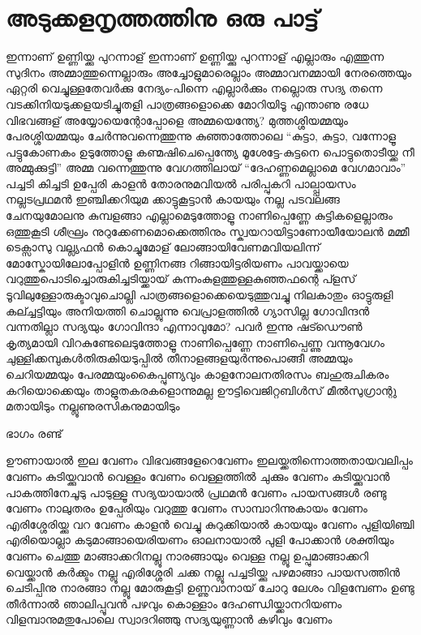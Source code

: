 \section{അടുക്കളനൃത്തത്തിനു ഒരു പാട്ട്}
\obeylines
\noindent
ഇന്നാണ്‌ ഉണ്ണിയ്ക്കു പുറന്നാള്‌
ഇന്നാണ്‌ ഉണ്ണിയ്ക്കു പുറന്നാള്‌
എല്ലാരും എത്തുന്ന സുദിനം
അമ്മാത്തുന്നെല്ലാരും അച്ചോളുമാരെല്ലാം
അമ്മാവനമ്മായി നേരത്തെയും
ഏറ്റരി വെച്ചുള്ളതേവർക്കു നേദ്യം-പിന്നെ
എല്ലാർക്കും നല്ലൊരു സദ്യ തന്നെ
വടക്കിനിയടുക്കളയടിച്ചുതളി
പാത്രങ്ങളൊക്കെ മോറിയിടൂ
എന്താണു രധേ വിഭവങ്ങള്‌
അയ്യോയെന്റോപ്പോളെ അമ്മയെന്ത്യേ?
മുത്തശ്ശിയമ്മയും പേരശ്ശിയമ്മയും
 ചേർന്നുവന്നെത്തുന്നു കുഞ്ഞാത്തോലെ
“കുട്ടാ, കുട്ടാ, വന്നോളൂ പട്ടുകോണകം ഉടുത്തോളൂ
കണ്മഷിചെപ്പെന്ത്യേ മൂശേട്ടേ-കുട്ടനെ
പൊട്ടുതൊടീയ്ക്ക നീ അമ്മുക്കുട്ടി”
അമ്മ വന്നെത്തുന്നു വേഗത്തിലായ്
“ദേഹണ്ണമെല്ലാമെ വേഗമാവാം”
പച്ചടി കിച്ചടി ഉപ്പേരി കാളൻ
തോരനുമവിയൽ പരിപ്പുകറി
പാല്പ്പായസം നല്ലടപ്രഥമൻ
ഇഞ്ചിക്കറിയുമ ക്കാട്ടുകൂട്ടാൻ
കായയും നല്ല പടവലങ്ങ
ചേനയുമോലനു കുമ്പളങ്ങാ
എല്ലാമെടുത്തോളൂ നാണിപ്പെണ്ണേ
കുട്ടികളെല്ലാരും ഒത്തുകൂടി
ശീഘ്രം നുറുക്കേണമൊക്കെത്തിനും
സ്ക്വയറായിട്ടാണോയീയോലൻ മമ്മീ
ടെക്സാസു വല്ല്യഫൻ കൊച്ചുമോള്‌
ലോങ്ങായിവേണമവിയലിന്ന്
മോസ്കോയിലോപ്പോളിൻ ഉണ്ണിനങ്ങ
റിങ്ങായിട്ടരിയണം പാവയ്ക്കായെ
വറുത്തുപൊടിച്ചൊരുകിച്ചടിയ്ക്കായ്
കുന്നംകുളത്തുള്ളകുഞ്ഞഫന്റെ
പ്ളസ് ടൂവിലുള്ളോരുക്ടാവുചൊല്ലി
പാത്രങ്ങളൊക്കെയെടുത്തുവച്ചു
നിലകാതും ഓട്ടുരുളി കല്ച്ചട്ടിയും
അനിയത്തി ചൊല്ലുന്നു വെപ്രാളത്തിൽ
ഗ്യാസില്ല ഗോവിന്ദൻ വന്നതില്ലാ
സദ്യയും ഗോവിന്ദാ എന്നാവുമോ?
പവർ ഇന്നു ഷട്ഡൌൺ കൃത്യമായി
വിറകുണ്ടേലെടുത്തോളൂ നാണിപ്പെണ്ണേ
   നാണിപ്പെണ്ണു വന്നൂവേഗം
   ചുള്ളിക്കമ്പുകൾതിരുകിയടുപ്പിൽ
തീനാളങ്ങളയുർന്നുപൊങ്ങീ
അമ്മയും ചെറിയമ്മയും പേരമ്മയുംകൈപ്പുണ്യവും
കാളനോലനതിരസം ബഹുരുചികരം
കറിയൊക്കെയും
താളുതകരകളൊന്നുമല്ല ഊട്ടിവെജിറ്റബിൾസ്
മീൽസുഗ്രാന്റു മതായിടും
നല്ലൂണുരസികനുമായിടും

ഭാഗം രണ്ട്

ഊണായാൽ ഇല വേണം
വിഭവങ്ങളേറെവേണം
ഇലയ്ക്കതിന്നൊത്തതായവലിപ്പം വേണം
കുടിയ്ക്കുവാൻ വെള്ളം വേണം
വെള്ളത്തിൽ ചുക്കും വേണം
കുടിയ്ക്കുവാൻ പാകത്തിനേചൂടു പാടുള്ളൂ
സദ്യയായാൽ പ്രഥമൻ വേണം
പായസങ്ങൾ രണ്ടു വേണം
നാലുതരം ഉപ്പേരിയും വറുത്തു വേണം
സാമ്പാറിന്നുകായം വേണം
എരിശ്ശേരിയ്ക്കു വറ വേണം
കാളൻ വെച്ചു കുറുക്കിയാൽ കായയും വേണം
പുളിയിഞ്ചി എരിയൊല്ലാ
കടുമാങ്ങായെരിയണം
ഓലനായാൽ പുളി പോക്കാൻ ശക്തിയും വേണം
ചെത്തു മാങ്ങാക്കറിനല്ലൂ
നാരങ്ങായും വെള്ള നല്ലൂ
ഉപ്പുമാങ്ങാക്കറി വെയ്ക്കാൻ കർക്ക്ടം നല്ലൂ
എരിശ്ശേരി ചക്ക നല്ലൂ
പച്ചടിയ്ക്കു പഴമാങ്ങാ
പായസത്തിൻ ചെടിപ്പിനു നാരങ്ങാ നല്ലൂ
മോരുകൂട്ടി ഉണ്ണുവാനായ്
ചോറു ലേശം വിളമ്പേണം
ഉണ്ടു തീർന്നാൽ ഞാലിപ്പൂവൻ പഴവും കൊള്ളാം
ദേഹണ്ഡിയ്ക്കാനറിയണം
വിളമ്പാനുമതുപോലെ
സ്വാദറിഞ്ഞു സദ്യയുണ്ണാൻ കഴിവും വേണം
